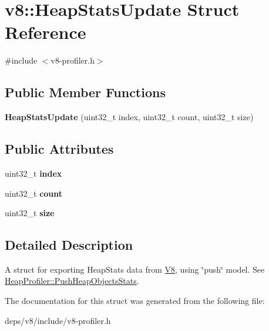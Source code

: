 \hypertarget{structv8_1_1_heap_stats_update}{}\section{v8\+:\+:Heap\+Stats\+Update Struct Reference}
\label{structv8_1_1_heap_stats_update}


{\ttfamily \#include $<$v8-\/profiler.\+h$>$}

\subsection*{Public Member Functions}
\begin{DoxyCompactItemize}
\item 
\hypertarget{structv8_1_1_heap_stats_update_aba606181fa7071647cc91a558c450cf3}{}{\bfseries Heap\+Stats\+Update} (uint32\+\_\+t index, uint32\+\_\+t count, uint32\+\_\+t size)\label{structv8_1_1_heap_stats_update_aba606181fa7071647cc91a558c450cf3}

\end{DoxyCompactItemize}
\subsection*{Public Attributes}
\begin{DoxyCompactItemize}
\item 
\hypertarget{structv8_1_1_heap_stats_update_a90f427acc6e9b8cf2001ca09541545d7}{}uint32\+\_\+t {\bfseries index}\label{structv8_1_1_heap_stats_update_a90f427acc6e9b8cf2001ca09541545d7}

\item 
\hypertarget{structv8_1_1_heap_stats_update_aa74badb1bd196e538b45b971350c33de}{}uint32\+\_\+t {\bfseries count}\label{structv8_1_1_heap_stats_update_aa74badb1bd196e538b45b971350c33de}

\item 
\hypertarget{structv8_1_1_heap_stats_update_a842a199bd372f411f0ae5816e38c45e2}{}uint32\+\_\+t {\bfseries size}\label{structv8_1_1_heap_stats_update_a842a199bd372f411f0ae5816e38c45e2}

\end{DoxyCompactItemize}


\subsection{Detailed Description}
A struct for exporting Heap\+Stats data from \hyperlink{classv8_1_1_v8}{V8}, using \char`\"{}push\char`\"{} model. See \hyperlink{classv8_1_1_heap_profiler_a62189d7a17f33bf6b33d7f550f906d24}{Heap\+Profiler\+::\+Push\+Heap\+Objects\+Stats}. 

The documentation for this struct was generated from the following file\+:\begin{DoxyCompactItemize}
\item 
deps/v8/include/v8-\/profiler.\+h\end{DoxyCompactItemize}

